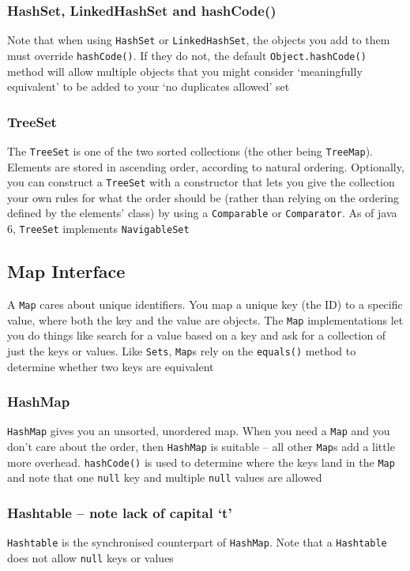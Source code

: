 \subsubsection{HashSet, LinkedHashSet and hashCode()}
Note that when using \verb#HashSet# or \verb#LinkedHashSet#, the objects you 
add to them must override \verb#hashCode()#. If they do not, the default 
\verb#Object.hashCode()# method will allow multiple objects that you might 
consider `meaningfully equivalent' to be added to your `no duplicates allowed' 
set

\subsubsection{TreeSet}
The \verb#TreeSet# is one of the two sorted collections (the other being 
\verb#TreeMap#). Elements are stored in ascending order, according to natural 
ordering. Optionally, you can construct a \verb#TreeSet# with a constructor 
that lets you give the collection your own rules for what the order should be 
(rather than relying on the ordering defined by the elements' class) by using a 
\verb#Comparable# or \verb#Comparator#. As of java 6, \verb#TreeSet# implements 
\verb#NavigableSet#

\subsection{Map Interface}
A \verb#Map# cares about unique identifiers. You map a unique key (the ID) to a 
specific value, where both the key and the value are objects. The \verb#Map# 
implementations let you do things like search for a value based on a key and 
ask for a collection of just the keys or values. Like \verb#Sets#, \verb#Map#s 
rely on the \verb#equals()# method to determine whether two keys are equivalent

\subsubsection{HashMap}
\verb#HashMap# gives  you an unsorted, unordered map. When you need a 
\verb#Map# and you don't care about the order, then \verb#HashMap# is suitable 
-- all other \verb#Map#s add a little more overhead. \verb#hashCode()# is used 
to determine where the keys land in the \verb#Map# and note that one 
\verb#null# key and multiple \verb#null# values are allowed

\subsubsection{Hashtable -- note lack of capital `t'}
\verb#Hashtable# is the synchronised counterpart of \verb#HashMap#. Note that a 
\verb#Hashtable# does not allow \verb#null# keys or values

